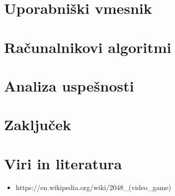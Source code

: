 \documentclass{article}
\begin{document}
\section{Uporabniški vmesnik}

\section{Računalnikovi algoritmi}

\section{Analiza uspešnosti}

\section{Zaključek}

\section{Viri in literatura}
\begin{itemize}
    \item https://en.wikipedia.org/wiki/2048_(video_game)
\end{itemize}
\end{document}
